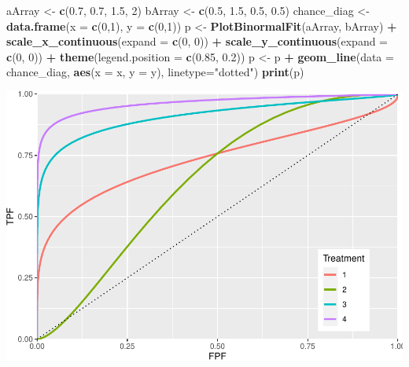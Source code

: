 \documentclass[
]{book}
\newenvironment{Shaded}{\begin{snugshade}}{\end{snugshade}}
\newcommand{\DataTypeTok}[1]{\textcolor[rgb]{0.13,0.29,0.53}{#1}}
\newcommand{\DecValTok}[1]{\textcolor[rgb]{0.00,0.00,0.81}{#1}}
\newcommand{\FloatTok}[1]{\textcolor[rgb]{0.00,0.00,0.81}{#1}}
\newcommand{\KeywordTok}[1]{\textcolor[rgb]{0.13,0.29,0.53}{\textbf{#1}}}
\newcommand{\NormalTok}[1]{#1}
\newcommand{\OperatorTok}[1]{\textcolor[rgb]{0.81,0.36,0.00}{\textbf{#1}}}
\newcommand{\StringTok}[1]{\textcolor[rgb]{0.31,0.60,0.02}{#1}}
\begin{document}
\begin{Shaded}
\begin{Highlighting}[]
\NormalTok{  aArray \textless{}{-}}\StringTok{ }\KeywordTok{c}\NormalTok{(}\FloatTok{0.7}\NormalTok{, }\FloatTok{0.7}\NormalTok{, }\FloatTok{1.5}\NormalTok{, }\DecValTok{2}\NormalTok{)}
\NormalTok{  bArray \textless{}{-}}\StringTok{ }\KeywordTok{c}\NormalTok{(}\FloatTok{0.5}\NormalTok{, }\FloatTok{1.5}\NormalTok{, }\FloatTok{0.5}\NormalTok{, }\FloatTok{0.5}\NormalTok{)}
\NormalTok{  chance\_diag \textless{}{-}}\StringTok{ }\KeywordTok{data.frame}\NormalTok{(}\DataTypeTok{x =} \KeywordTok{c}\NormalTok{(}\DecValTok{0}\NormalTok{,}\DecValTok{1}\NormalTok{), }\DataTypeTok{y =} \KeywordTok{c}\NormalTok{(}\DecValTok{0}\NormalTok{,}\DecValTok{1}\NormalTok{))}
\NormalTok{  p \textless{}{-}}\StringTok{ }\KeywordTok{PlotBinormalFit}\NormalTok{(aArray, bArray) }\OperatorTok{+}
\StringTok{    }\KeywordTok{scale\_x\_continuous}\NormalTok{(}\DataTypeTok{expand =} \KeywordTok{c}\NormalTok{(}\DecValTok{0}\NormalTok{, }\DecValTok{0}\NormalTok{)) }\OperatorTok{+}\StringTok{ }
\StringTok{    }\KeywordTok{scale\_y\_continuous}\NormalTok{(}\DataTypeTok{expand =} \KeywordTok{c}\NormalTok{(}\DecValTok{0}\NormalTok{, }\DecValTok{0}\NormalTok{)) }\OperatorTok{+}
\StringTok{    }\KeywordTok{theme}\NormalTok{(}\DataTypeTok{legend.position =} \KeywordTok{c}\NormalTok{(}\FloatTok{0.85}\NormalTok{, }\FloatTok{0.2}\NormalTok{))}
\NormalTok{p \textless{}{-}}\StringTok{ }\NormalTok{p }\OperatorTok{+}\StringTok{ }\KeywordTok{geom\_line}\NormalTok{(}\DataTypeTok{data =}\NormalTok{ chance\_diag, }\KeywordTok{aes}\NormalTok{(}\DataTypeTok{x =}\NormalTok{ x, }\DataTypeTok{y =}\NormalTok{ y), }\DataTypeTok{linetype=}\StringTok{"dotted"}\NormalTok{)}
\KeywordTok{print}\NormalTok{(p)}
\end{Highlighting}
\end{Shaded}

\begin{center}\includegraphics{21-improperROCs_files/figure-latex/unnamed-chunk-1-1} \end{center}
\end{document}
